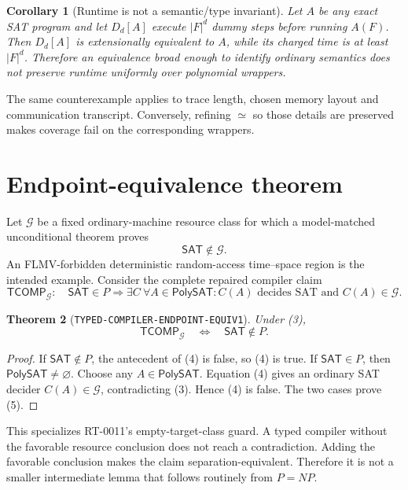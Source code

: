 \documentclass[11pt]{article}
\newtheorem{theorem}{Theorem}
\newtheorem{corollary}[theorem]{Corollary}
\newcommand{\SAT}{\mathsf{SAT}}
\newcommand{\PolySAT}{\mathsf{PolySAT}}
\begin{document}
\begin{corollary}[Runtime is not a semantic/type invariant]
Let \(A\) be any exact SAT program and let \(D_d[A]\) execute
\(|F|^d\) dummy steps before running \(A(F)\).  Then \(D_d[A]\) is
extensionally equivalent to \(A\), while its charged time is at least
\(|F|^d\).  Therefore an equivalence broad enough to identify ordinary
semantics does not preserve runtime uniformly over polynomial wrappers.
\end{corollary}

The same counterexample applies to trace length, chosen memory layout and
communication transcript.  Conversely, refining \(\simeq\) so those
details are preserved makes coverage fail on the corresponding wrappers.

\section{Endpoint-equivalence theorem}
Let \(\mathcal G\) be a fixed ordinary-machine resource class for which a
model-matched unconditional theorem proves
\[
 \SAT\notin\mathcal G.
 \tag{3}
\]
An FLMV-forbidden deterministic random-access time--space region is the
intended example.  Consider the complete repaired compiler claim
\[
 \mathsf{TCOMP}_{\mathcal G}:\quad
 \SAT\in P\Longrightarrow
 \exists C\ \forall A\in\PolySAT:
 C(A)\text{ decides SAT and }C(A)\in\mathcal G.
 \tag{4}
\]

\begin{theorem}[\texttt{TYPED-COMPILER-ENDPOINT-EQUIV1}]
Under (3),
\[
 \mathsf{TCOMP}_{\mathcal G}
 \quad\Longleftrightarrow\quad
 \SAT\notin P.
 \tag{5}
\]
\end{theorem}

\begin{proof}
If \(\SAT\notin P\), the antecedent of (4) is false, so (4) is true.  If
\(\SAT\in P\), then \(\PolySAT\neq\varnothing\).  Choose any
\(A\in\PolySAT\).  Equation (4) gives an ordinary SAT decider
\(C(A)\in\mathcal G\), contradicting (3).  Hence (4) is false.  The two
cases prove (5).
\end{proof}

This specializes RT-0011's empty-target-class guard.  A typed compiler
without the favorable resource conclusion does not reach a contradiction.
Adding the favorable conclusion makes the claim separation-equivalent.
Therefore it is not a smaller intermediate lemma that follows routinely from
\(P=NP\).
\end{document}
